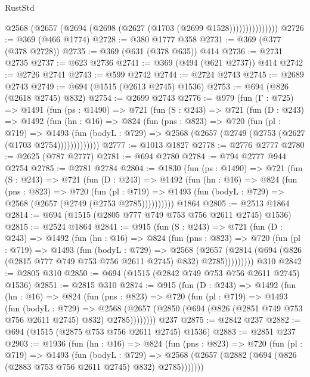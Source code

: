 \begin{lexlean}{RustStd}
\begin{coremodule}
                    @2568 (@2657 (@2694 (@2698 (@2627 (@1703 (@2699 @1528)))))))))))))))
@2726 := @369 (@466 @1774)
@2728 := @380 @1777 @358
@2731 := @369 (@377 (@378 @2728))
@2735 := @369 (@631 (@378 @635)) @414
@2736 := @2731 @2735
@2737 := @623 @2736
@2741 := @369 (@494 (@621 @2737)) @414
@2742 := @2726 @2741
@2743 := @599 @2742
@2744 := @2724 @2743
@2745 := @2689 @2743
@2749 := @694 (@1515 (@2613 @2745) @1536)
@2753 := @694 (@826 (@2618 @2745) @832)
@2754 := @2699 @2743
@2776 := @979
    (fun (Γ : @725) =>
    @1491
      (fun (ps : @1490) =>
      @721
        (fun (S : @243) =>
        @721
          (fun (D : @243) =>
          @1492
            (fun (hn : @16) =>
            @824
              (fun (pns : @823) =>
              @720
                (fun (pl : @719) =>
                @1493
                  (fun (bodyL : @729) => @2568 (@2657 (@2749 (@2753 (@2627 (@1703 @2754)))))))))))))
@2777 := @1013 @1827
@2778 := @2776 @2777
@2780 := @2625 (@787 @2777)
@2781 := @694 @2780
@2784 := @794 @2777 @944 @2754
@2785 := @2781 @2784
@2804 := @1830
    (fun (ps : @1490) =>
    @721
      (fun (S : @243) =>
      @721
        (fun (D : @243) =>
        @1492
          (fun (hn : @16) =>
          @824
            (fun (pns : @823) =>
            @720
              (fun (pl : @719) =>
              @1493 (fun (bodyL : @729) => @2568 (@2657 (@2749 (@2753 @2785))))))))))
    @1864
@2805 := @2513 @1864
@2814 := @694 (@1515 (@2805 @777 @749 @753 @756 @2611 @2745) @1536)
@2815 := @2524 @1864
@2841 := @915
    (fun (S : @243) =>
    @721
      (fun (D : @243) =>
      @1492
        (fun (hn : @16) =>
        @824
          (fun (pns : @823) =>
          @720
            (fun (pl : @719) =>
            @1493
              (fun (bodyL : @729) =>
              @2568
                (@2657
                  (@2814 (@694 (@826 (@2815 @777 @749 @753 @756 @2611 @2745) @832) @2785)))))))))
    @310
@2842 := @2805 @310
@2850 := @694 (@1515 (@2842 @749 @753 @756 @2611 @2745) @1536)
@2851 := @2815 @310
@2874 := @915
    (fun (D : @243) =>
    @1492
      (fun (hn : @16) =>
      @824
        (fun (pns : @823) =>
        @720
          (fun (pl : @719) =>
          @1493
            (fun (bodyL : @729) =>
            @2568 (@2657 (@2850 (@694 (@826 (@2851 @749 @753 @756 @2611 @2745) @832) @2785))))))))
    @237
@2875 := @2842 @237
@2882 := @694 (@1515 (@2875 @753 @756 @2611 @2745) @1536)
@2883 := @2851 @237
@2903 := @1936
    (fun (hn : @16) =>
    @824
      (fun (pns : @823) =>
      @720
        (fun (pl : @719) =>
        @1493
          (fun (bodyL : @729) =>
          @2568 (@2657 (@2882 (@694 (@826 (@2883 @753 @756 @2611 @2745) @832) @2785)))))))

\end{coremodule}
\end{lexlean}
